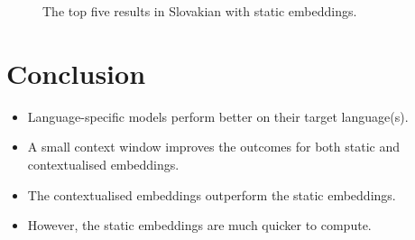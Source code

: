 \begin{figure}
  \centering
  \caption{The top five results in Slovakian with static embeddings.}
\end{figure}

\section{Conclusion}

\begin{itemize}
  \item Language-specific models perform better on their target language(s).
  \item A small context window improves the outcomes for both static and contextualised embeddings.
  \item The contextualised embeddings outperform the static embeddings.
  \item However, the static embeddings are much quicker to compute.
\end{itemize}
